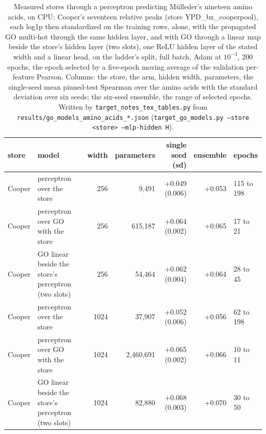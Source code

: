 \begin{table}[H]
  \centering
  \footnotesize
  \caption[Cooper's peaks through a perceptron]{Measured stores through a perceptron predicting M\"ulleder's nineteen amino acids, on CPU: Cooper's seventeen relative peaks (store YPD\_bx\_cooperpool), each log1p then standardized on the training rows, alone, with the propagated GO multi-hot through the same hidden layer, and with GO through a linear map beside the store's hidden layer (two slots), one ReLU hidden layer of the stated width and a linear head, on the ladder's split, full batch, Adam at $10^{-3}$, 200 epochs, the epoch selected by a five-epoch moving average of the validation per-feature Pearson. Columns: the store, the arm, hidden width, parameters, the single-seed mean pinned-test Spearman over the amino acids with the standard deviation over six seeds; the six-seed ensemble, the range of selected epochs. Written by \texttt{target\_notes\_tex\_tables.py} from \texttt{results/go\_models\_amino\_acids\_*.json} (\texttt{target\_go\_models.py --store <store> --mlp-hidden H}).}
  \label{tab:cooper-mlp-amino-acids}
  \begin{tabular}{@{}llrrrrl@{}}
    \hline
    store & model & width & parameters & single seed (sd) & ensemble & epochs \\
    \hline
    Cooper & perceptron over the store & 256 & 9,491 & +0.049 (0.006) & +0.053 & 115 to 198 \\
    Cooper & perceptron over GO with the store & 256 & 615,187 & +0.064 (0.002) & +0.065 & 17 to 21 \\
    Cooper & GO linear beside the store's perceptron (two slots) & 256 & 54,464 & +0.062 (0.004) & +0.064 & 28 to 45 \\
    Cooper & perceptron over the store & 1024 & 37,907 & +0.052 (0.006) & +0.056 & 62 to 198 \\
    Cooper & perceptron over GO with the store & 1024 & 2,460,691 & +0.065 (0.002) & +0.066 & 10 to 11 \\
    Cooper & GO linear beside the store's perceptron (two slots) & 1024 & 82,880 & +0.068 (0.003) & +0.070 & 30 to 50 \\
    \hline
  \end{tabular}
\end{table}

